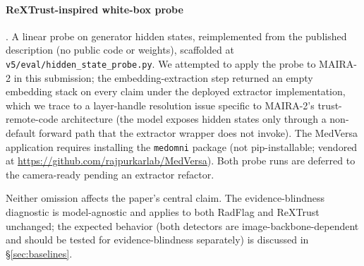 \documentclass[pmlr]{jmlr}
\begin{document}
\paragraph{ReXTrust-inspired white-box probe} \citep{hardy2024rextrust}. A linear probe on generator hidden states, reimplemented from the published description (no public code or weights), scaffolded at \texttt{v5/eval/hidden\_state\_probe.py}. We attempted to apply the probe to MAIRA-2 in this submission; the embedding-extraction step returned an empty embedding stack on every claim under the deployed extractor implementation, which we trace to a layer-handle resolution issue specific to MAIRA-2's trust-remote-code architecture (the model exposes hidden states only through a non-default forward path that the extractor wrapper does not invoke). The MedVersa application requires installing the \texttt{medomni} package (not pip-installable; vendored at \url{https://github.com/rajpurkarlab/MedVersa}). Both probe runs are deferred to the camera-ready pending an extractor refactor.

Neither omission affects the paper's central claim. The evidence-blindness diagnostic is model-agnostic and applies to both RadFlag and ReXTrust unchanged; the expected behavior (both detectors are image-backbone-dependent and should be tested for evidence-blindness separately) is discussed in §\ref{sec:baselines}.
\end{document}
